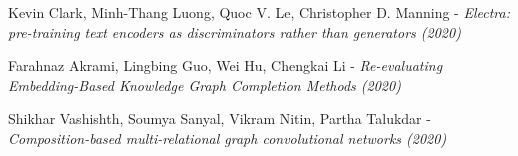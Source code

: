 \documentclass[longabstract, english, mgr]{iithesis}
\theoremstyle{default_theorem_style}\newtheorem{theorem}{Theorem}
\theoremstyle{default_theorem_style}\newtheorem{definition}{Definition}
\begin{document}
\begin{thebibliography}{99}
Kevin Clark, Minh-Thang Luong, Quoc V. Le, Christopher D. Manning - \textit{Electra: pre-training text encoders
as discriminators rather than generators (2020)}

Farahnaz Akrami, Lingbing Guo, Wei Hu, Chengkai Li - \textit{Re-evaluating Embedding-Based Knowledge Graph
Completion Methods (2020)}

Shikhar Vashishth, Soumya Sanyal, Vikram Nitin, Partha Talukdar - \textit{Composition-based multi-relational graph
convolutional networks (2020)}

\end{thebibliography}
\end{document}
